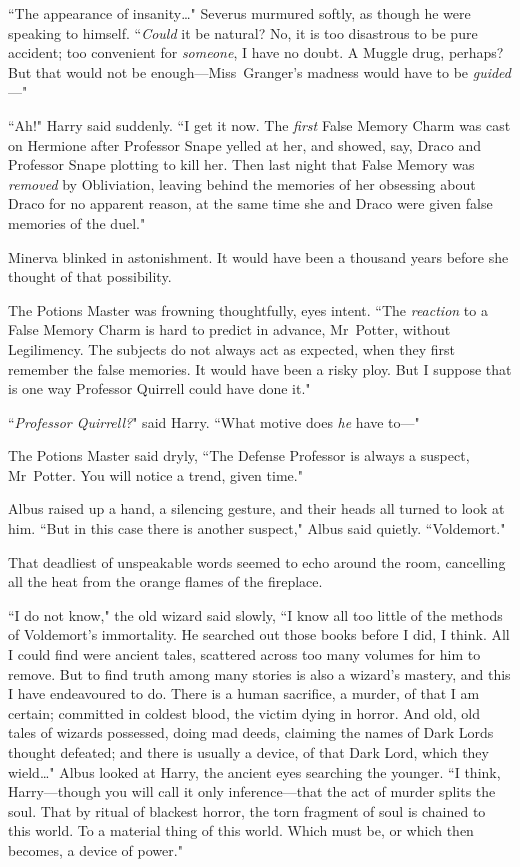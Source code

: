 ``The appearance of insanity{\ldots}" Severus murmured softly, as though he were speaking to himself. ``\emph{Could} it be natural? No, it is too disastrous to be pure accident; too convenient for \emph{someone}, I have no doubt. A Muggle drug, perhaps? But that would not be enough—Miss~Granger's madness would have to be \emph{guided}—"

``Ah!" Harry said suddenly. ``I get it now. The \emph{first} False Memory Charm was cast on Hermione after Professor Snape yelled at her, and showed, say, Draco and Professor Snape plotting to kill her. Then last night that False Memory was \emph{removed} by Obliviation, leaving behind the memories of her obsessing about Draco for no apparent reason, at the same time she and Draco were given false memories of the duel."

Minerva blinked in astonishment. It would have been a thousand years before she thought of that possibility.

The Potions Master was frowning thoughtfully, eyes intent. ``The \emph{reaction} to a False Memory Charm is hard to predict in advance, Mr~Potter, without Legilimency. The subjects do not always act as expected, when they first remember the false memories. It would have been a risky ploy. But I suppose that is one way Professor Quirrell could have done it."

``\emph{Professor Quirrell?}" said Harry. ``What motive does \emph{he} have to—"

The Potions Master said dryly, ``The Defense Professor is always a suspect, Mr~Potter. You will notice a trend, given time."

Albus raised up a hand, a silencing gesture, and their heads all turned to look at him. ``But in this case there is another suspect," Albus said quietly. ``Voldemort."

That deadliest of unspeakable words seemed to echo around the room, cancelling all the heat from the orange flames of the fireplace.

``I do not know," the old wizard said slowly, ``I know all too little of the methods of Voldemort's immortality. He searched out those books before I did, I think. All I could find were ancient tales, scattered across too many volumes for him to remove. But to find truth among many stories is also a wizard's mastery, and this I have endeavoured to do. There is a human sacrifice, a murder, of that I am certain; committed in coldest blood, the victim dying in horror. And old, old tales of wizards possessed, doing mad deeds, claiming the names of Dark Lords thought defeated; and there is usually a device, of that Dark Lord, which they wield{\ldots}" Albus looked at Harry, the ancient eyes searching the younger. ``I think, Harry—though you will call it only inference—that the act of murder splits the soul. That by ritual of blackest horror, the torn fragment of soul is chained to this world. To a material thing of this world. Which must be, or which then becomes, a device of power."

